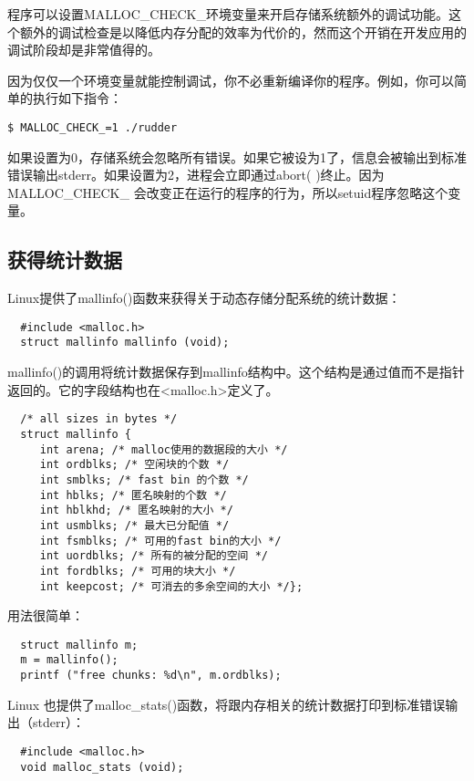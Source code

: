 程序可以设置MALLOC\_CHECK\_环境变量来开启存储系统额外的调试功能。这个额外的调试检查是以降低内存分配的效率为代价的，然而这个开销在开发应用的调试阶段却是非常值得的。

因为仅仅一个环境变量就能控制调试，你不必重新编译你的程序。例如，你可以简单的执行如下指令： 

\begin{lstlisting}
$ MALLOC_CHECK_=1 ./rudder
\end{lstlisting}

如果设置为0，存储系统会忽略所有错误。如果它被设为1了，信息会被输出到标准错误输出stderr。如果设置为2，进程会立即通过abort( )终止。因为 MALLOC\_CHECK\_ 会改变正在运行的程序的行为，所以setuid程序忽略这个变量。 

\subsection{获得统计数据}

Linux提供了mallinfo()函数来获得关于动态存储分配系统的统计数据： 

\begin{lstlisting}
  #include <malloc.h>
  struct mallinfo mallinfo (void);
\end{lstlisting}

mallinfo()的调用将统计数据保存到mallinfo结构中。这个结构是通过值而不是指针返回的。它的字段结构也在<malloc.h>定义了。

\begin{lstlisting}
  /* all sizes in bytes */
  struct mallinfo {
     int arena; /* malloc使用的数据段的大小 */
     int ordblks; /* 空闲块的个数 */
     int smblks; /* fast bin 的个数 */
     int hblks; /* 匿名映射的个数 */
     int hblkhd; /* 匿名映射的大小 */
     int usmblks; /* 最大已分配值 */
     int fsmblks; /* 可用的fast bin的大小 */
     int uordblks; /* 所有的被分配的空间 */
     int fordblks; /* 可用的块大小 */
     int keepcost; /* 可消去的多余空间的大小 */};
\end{lstlisting}


用法很简单： 

\begin{lstlisting}
  struct mallinfo m;
  m = mallinfo();
  printf ("free chunks: %d\n", m.ordblks);
\end{lstlisting}

Linux 也提供了malloc\_stats()函数，将跟内存相关的统计数据打印到标准错误输出（stderr）： 

\begin{lstlisting}
  #include <malloc.h>
  void malloc_stats (void);
\end{lstlisting}

